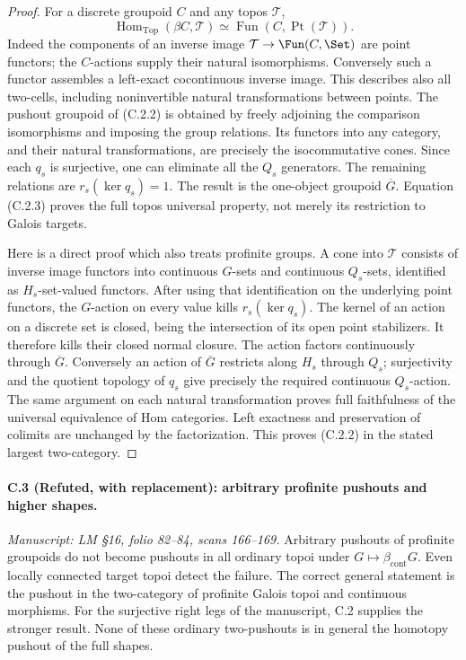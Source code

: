 \begin{proof}
For a discrete groupoid $C$ and any topos $\mathcal T$,
\[
 \operatorname{Hom}_{\mathrm{Top}}(\beta C,\mathcal T)
                \simeq\operatorname{Fun}(C,\operatorname{Pt}(\mathcal T)).
                                                               \tag{C.2.3}
\]
Indeed the components of an inverse image
$\mathcal T\to\Fun(C,\Set)$ are point functors; the
$C$-actions supply their natural isomorphisms.
Conversely such a functor assembles a left-exact
cocontinuous inverse image. This describes also all
two-cells, including noninvertible natural
transformations between points. The pushout groupoid
of (C.2.2) is obtained by freely adjoining the
comparison isomorphisms and imposing the group
relations. Its functors into any category, and their
natural transformations, are precisely the
isocommutative cones. Since each $q_s$ is surjective,
one can eliminate all the $Q_s$ generators. The
remaining relations are $r_s(\ker q_s)=1$. The
result is the one-object groupoid $\overline G$.
Equation (C.2.3) proves the full topos universal
property, not merely its restriction to Galois targets.

Here is a direct proof which also treats profinite
groups. A cone into $\mathcal T$ consists of inverse
image functors into continuous $G$-sets and continuous
$Q_s$-sets, identified as $H_s$-set-valued functors.
After using that identification on the underlying
point functors, the $G$-action on every value kills
$r_s(\ker q_s)$. The kernel of an action on a discrete
set is closed, being the intersection of its open
point stabilizers. It therefore kills their closed
normal closure. The action factors continuously
through $\overline G$. Conversely an action of
$\overline G$ restricts along $H_s$ through $Q_s$;
surjectivity and the quotient topology of $q_s$
give precisely the required continuous $Q_s$-action.
The same argument on each natural transformation
proves full faithfulness of the universal equivalence
of Hom categories. Left exactness and preservation
of colimits are unchanged by the factorization.
This proves (C.2.2) in the stated largest two-category.
\end{proof}

\paragraph{C.3 (Refuted, with replacement): arbitrary profinite pushouts and higher shapes.}\label{C3}
\textit{Manuscript: LM \S16, folio 82--84, scans 166--169.}
Arbitrary pushouts of profinite groupoids do not
become pushouts in all ordinary topoi under
$G\mapsto\beta_{\mathrm{cont}}G$. Even locally connected
target topoi detect the failure. The correct general
statement is the pushout in the two-category of
profinite Galois topoi and continuous morphisms.
For the surjective right legs of the manuscript,
C.2 supplies the stronger result. None of these
ordinary two-pushouts is in general the homotopy
pushout of the full shapes.

